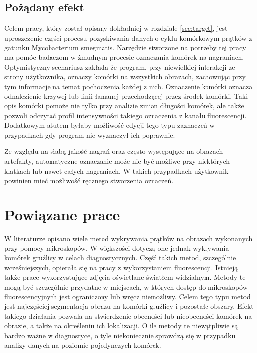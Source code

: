\documentclass[declaration,shortabstract,mgr]{iithesis}
\begin{document}
\subsection{Pożądany efekt}

Celem pracy, który został opisany dokładniej w rozdziale \ref{sec:target}, jest uproszczenie części procesu pozyskiwania danych o cyklu komórkowym prątków z gatunku Mycobacterium smegmatis.
Narzędzie stworzone na potrzeby tej pracy ma pomóc badaczom w żmudnym procesie oznaczania komórek na nagraniach.
Optymistyczny scenariusz zakłada że program, przy niewielkiej interakcji ze strony użytkownika, oznaczy komórki na wszystkich obrazach, zachowując przy tym informacje na temat pochodzenia każdej z nich.
Oznaczenie komórki oznacza odnalezienie krzywej lub linii łamanej przechodzącej przez środek komórki.
Taki opis komórki pomoże nie tylko przy analizie zmian długości komórek, ale także pozwoli odczytać profil intensywności takiego oznaczenia z kanału fluorescencji.
Dodatkowym atutem byłaby możliwość edycji tego typu zaznaczeń w przypadkach gdy program nie wyznaczył ich poprawnie.

Ze względu na słabą jakość nagrań oraz często występujące na obrazach artefakty, automatyczne oznaczanie może nie być możliwe przy niektórych klatkach lub nawet całych nagraniach.
W takich przypadkach użytkownik powinien mieć możliwość ręcznego stworzenia oznaczeń.

\section{Powiązane prace}


W literaturze opisano wiele metod wykrywania prątków na obrazach wykonanych przy pomocy mikroskopów.
W większości dotyczą one jednak wykrywania komórek gruźlicy w celach diagnostycznych.
Część takich metod, szczególnie wcześniejszych, opierała się na pracy z wykorzystaniem fluorescencji\cite{paper:detection-of-tb-with-ip}.
Istnieją także prace wykorzystujące zdjęcia oświetlane światłem widzialnym.
Metody te mogą być szczególnie przydatne w miejscach, w których dostęp do mikroskopów fluorescencyjnych jest ograniczony lub wręcz niemożliwy\cite{paper:ip-techniques-for-identifying-tb}.
Celem tego typu metod jest najczęściej segmentacja obrazu na komórki gruźlicy i pozostałe obszary.
Efekt takiego działania pozwala na stwierdzenie obecności lub nieobecności komórek na obrazie, a także na określeniu ich lokalizacji. O ile metody te niewątpliwie są bardzo ważne w diagnostyce, o tyle niekoniecznie sprawdzą się w przypadku analizy danych na poziomie pojedynczych komórek.
\end{document}
